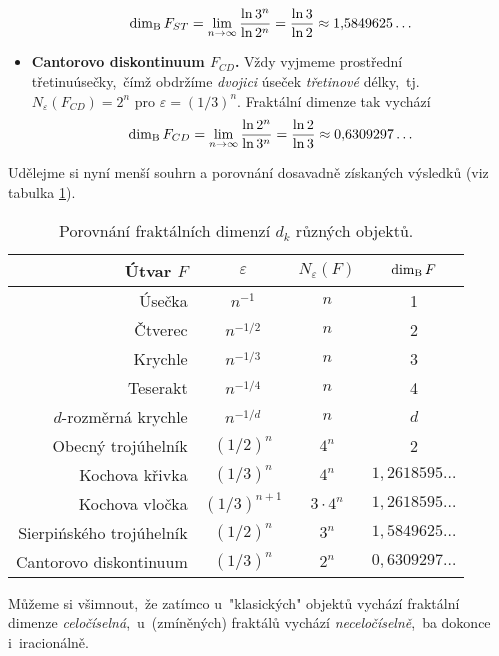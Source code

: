 \begin{itemize}
    \begin{equation}\label{eq:sierpinskeho-trojuhelnik-dimenze}
        \operatorname{dim_B}{F_{ST}}=\lim_{n\to\infty}{\dfrac{\ln{3^n}}{\ln{2^{n}}}}=\dfrac{\ln{3}}{\ln{2}}\approx 1{,}5849625\dots
    \end{equation}
    \item \textbf{Cantorovo diskontinuum $F_{CD}$.} Vždy vyjmeme prostřední třetinu\linebreak{}úsečky,~čímž obdržíme \emph{dvojici} úseček \emph{třetinové} délky,~tj. $N_\varepsilon(F_{CD})=2^n$ pro $\varepsilon=(1/3)^n$. Fraktální dimenze tak vychází
    \begin{equation}\label{eq:cantorovo-diskontinuum-dimenze}
        \operatorname{dim_B}{F_{CD}}=\lim_{n\to\infty}{\dfrac{\ln{2^n}}{\ln{3^n}}}=\dfrac{\ln{2}}{\ln{3}}\approx 0{,}6309297\dots
    \end{equation}
\end{itemize}
Udělejme si nyní menší souhrn a porovnání dosavadně získaných výsledků (viz tabulka \ref{table:fraktaly-eukleides-dimenze}).
\begin{table}[h]
    \centering
    \begin{tabular}{r|ccc}
        Útvar $F$                & $\varepsilon$ & $N_\varepsilon(F)$ & $\operatorname{dim_B}{F}$         \\ \hline
        Úsečka                   & $n^{-1}$      & $n$                & 1                  \\
        Čtverec                  & $n^{-1/2}$    & $n$                & 2                  \\
        Krychle                  & $n^{-1/3}$    & $n$                & 3                  \\
        Teserakt                 & $n^{-1/4}$    & $n$                & 4                  \\
        $d$-rozměrná krychle     & $n^{-1/d}$    & $n$                & $d$                \\
        Obecný trojúhelník       & $(1/2)^n$     & $4^n$              & 2                  \\
        Kochova křivka           & $(1/3)^n$     & $4^n$              & $1{,}2618595\dots$ \\
        Kochova vločka           & $(1/3)^{n+1}$ & $3\cdot 4^n$       & $1{,}2618595\dots$ \\
        Sierpińského trojúhelník & $(1/2)^n$     & $3^n$              & $1{,}5849625\dots$ \\
        Cantorovo diskontinuum   & $(1/3)^n$     & $2^n$              & $0{,}6309297\dots$ \\
    \end{tabular}
    \caption{Porovnání fraktálních dimenzí $d_k$ různých objektů.}
    \label{table:fraktaly-eukleides-dimenze}
\end{table}
Můžeme si všimnout,~že zatímco u~"klasických" objektů vychází fraktální dimenze \emph{celočíselná},~u~(zmíněných) fraktálů vychází \emph{neceločíselně},~ba dokonce i~iracionálně.

